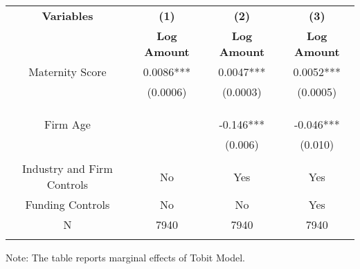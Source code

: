  \begin{table}[htbp]
    \begin{tabular}{c c c c }
    \toprule
    \textbf{Variables} & \textbf{(1)} & \textbf{(2)} & \textbf{(3)}             \\ 
    \textbf & \textbf{Log Amount} & \textbf{Log Amount} & \textbf{Log Amount}   \\ 

    \midrule
    Maternity Score     &   0.0086*** &      0.0047*** &     0.0052***   \\
                        &  (0.0006)  &      (0.0003)   &       (0.0005)  \\
                        &             &                &                \\

                        &             &                &               \\
                        &             &                &                \\
    Firm Age            &             &      -0.146*** &      -0.046***    \\
                        &             &      (0.006)   &      (0.010)       \\
                        &             &                &                    \\
   Industry and Firm Controls   &   No        &   Yes       &        Yes    \\
    Funding Controls    &   No             &   No        &     Yes        \\

    \midrule
     N                  &   7940          &      7940  &      7940      \\          
    \bottomrule
    \addlinespace[1ex]
    \multicolumn{3}{l}{\textsuperscript{***}$P<0.01$, 
      \textsuperscript{**}$P<0.05$, 
      \textsuperscript{*}$P<0.1$}
    \end{tabular}
    \newline
    Note: The table reports marginal effects of Tobit Model.
\end{table}
